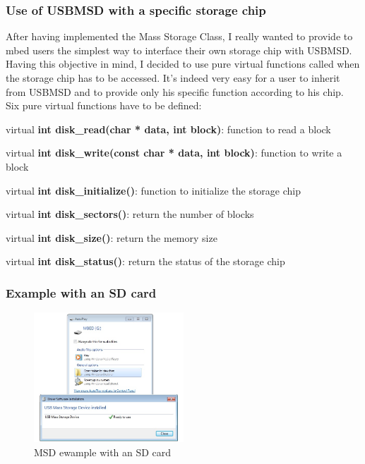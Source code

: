 \documentclass[pdftex,10pt,a4paper]{report}
\newenvironment{packed_item}{
\begin{itemize}
  \setlength{\itemsep}{1pt}
  \setlength{\parskip}{0pt}
  \setlength{\parsep}{0pt}
}{\end{itemize}}
\begin{document}
\subsubsection{Use of USBMSD with a specific storage chip}
After having implemented the Mass Storage Class, I really wanted to provide to mbed users the simplest way to interface their own storage chip with USBMSD. Having this objective in mind, I decided to use pure virtual functions called when the storage chip has to be accessed. It's indeed very easy for a user to inherit from USBMSD and to provide only his specific function according to his chip.\\

Six pure virtual functions have to be defined:
\begin{packed_item}
	\item virtual \textbf{int disk\_read(char * data, int block)}: function to read a block
	\item virtual \textbf{int disk\_write(const char * data, int block)}: function to write a block
	\item virtual \textbf{int disk\_initialize()}: function to initialize the storage chip
	\item virtual \textbf{int disk\_sectors()}: return the number of blocks
	\item virtual \textbf{int disk\_size()}: return the memory size
	\item virtual \textbf{int disk\_status()}: return the status of the storage chip
\end{packed_item}

\subsubsection{Example with an SD card}

\begin{figure}[h!]
		\centering
		\includegraphics[width=0.5\textwidth]{./msd_windows.jpg}
		\caption{MSD ewample with an SD card}
		\label{MSD ewample with an SD card}
\end{figure}
\end{document}

